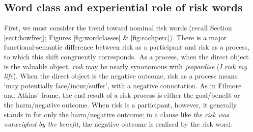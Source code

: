\subsection{Word class and experiential role of risk words} \label{sect:diff_between_nom_ver_risk}

First, we must consider the trend toward nominal risk words (recall Section \ref{sect:howfreq}; Figures \ref{fig:wordclasses} \& \ref{fig:eachperc}). There is a major functional-semantic difference between risk as a participant and risk as a process, to which this shift congruently corresponds.~As a process, when the direct object is the valuable object, \emph{risk} may be nearly synonomous with \emph{jeopardise} (\emph{I risk my life}). When the direct object is the negative outcome, risk as a process means `may potentially face\slash incur\slash suffer', with a negative connotation. As in Filmore and Atkins' frame, the end result of a risk process is either the goal\slash benefit or the harm\slash negative outcome. When risk is a participant, however, it generally stands in for only the harm\slash negative outcome: in a clause like \emph{the risk was outweighed by the benefit}, the negative outcome is realised by the risk word:

